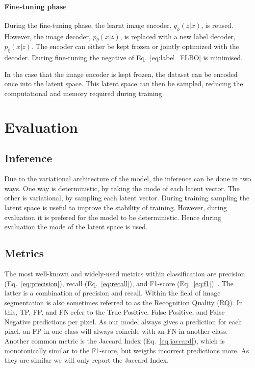 \paragraph*{Fine-tuning phase} During the fine-tuning phase, the learnt image encoder, $q_\phi(z|x)$, is reused. However, the image decoder, $p_\theta(x|z)$, is replaced with a new label decoder, $p_\xi(x|z)$. The encoder can either be kept frozen or jointly optimized with the decoder. During fine-tuning the negative of Eq.~\ref{eq:label_ELBO} is minimised.

In the case that the image encoder is kept frozen, the dataset can be encoded once into the latent space. This latent space can then be sampled, reducing the computational and memory required during training.

\section{Evaluation}
\subsection{Inference}
Due to the variational architecture of the model, the inference can be done in two ways. One way is deterministic, by taking the mode of each latent vector. The other is variational, by sampling each latent vector. During training sampling the latent space is useful to improve the stability of training. However, during evaluation it is prefered for the model to be deterministic. Hence during evaluation the mode of the latent space is used.

\subsection{Metrics}
The most well-known and widely-used metrics within classification are precision (Eq.~\ref{eq:precision}), recall (Eq.~\ref{eq:recall}), and F1-score (Eq.~\ref{eq:f1})~\cite{rijsbergen1979information}. The latter is a combination of precision and recall. Within the field of image segmentation is also sometimes referred to as the Recognition Quality (RQ). In this, TP, FP, and FN refer to the True Positive, False Positive, and False Negative predictions per pixel. As our model always gives a prediction for each pixel, an FP in one class will always coincide with an FN in another class. Another common metric is the Jaccard Index (Eq.~\ref{eq:jaccard}), which is monotonically similar to the F1-score, but weigths incorrect predictions more. As they are similar we will only report the Jaccard Index.

